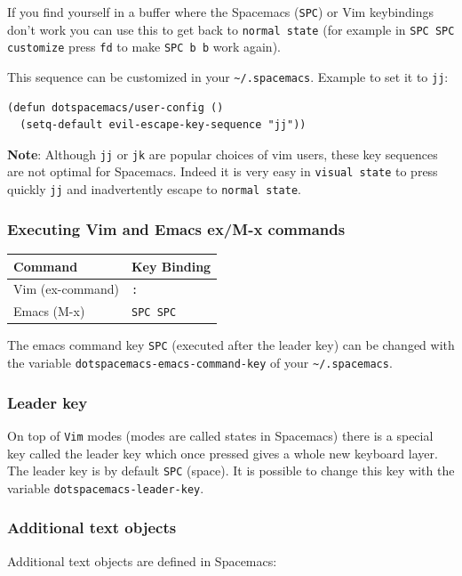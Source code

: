 \documentclass[11pt]{article}
\begin{document}
If you find yourself in a buffer where the Spacemacs (\texttt{SPC}) or Vim keybindings
don't work you can use this to get back to \texttt{normal state} (for example in \texttt{SPC
SPC customize} press \texttt{fd} to make \texttt{SPC b b} work again).

This sequence can be customized in your \texttt{\textasciitilde{}/.spacemacs}.
Example to set it to \texttt{jj}:

\begin{verbatim}
(defun dotspacemacs/user-config ()
  (setq-default evil-escape-key-sequence "jj"))
\end{verbatim}

\textbf{Note}: Although \texttt{jj} or \texttt{jk} are popular choices of vim users, these key
sequences are not optimal for Spacemacs. Indeed it is very easy in \texttt{visual
state} to press quickly \texttt{jj} and inadvertently escape to \texttt{normal state}.

\subsubsection{Executing Vim and Emacs ex/M-x commands}
\label{sec:orgf65b1d0}

\begin{center}
\begin{tabular}{ll}
Command & Key Binding\\
\hline
Vim (ex-command) & \texttt{:}\\
Emacs (M-x) & \texttt{SPC SPC}\\
\end{tabular}
\end{center}

The emacs command key \texttt{SPC} (executed after the leader key) can be changed
with the variable \texttt{dotspacemacs-emacs-command-key} of your \texttt{\textasciitilde{}/.spacemacs}.

\subsubsection{Leader key}
\label{sec:org2cdbc68}
On top of \texttt{Vim} modes (modes are called states in Spacemacs) there is a
special key called the leader key which once pressed gives a whole new keyboard
layer. The leader key is by default \texttt{SPC} (space). It is possible to change this
key with the variable \texttt{dotspacemacs-leader-key}.

\subsubsection{Additional text objects}
\label{sec:orgdc620fc}
Additional text objects are defined in Spacemacs:
\end{document}
